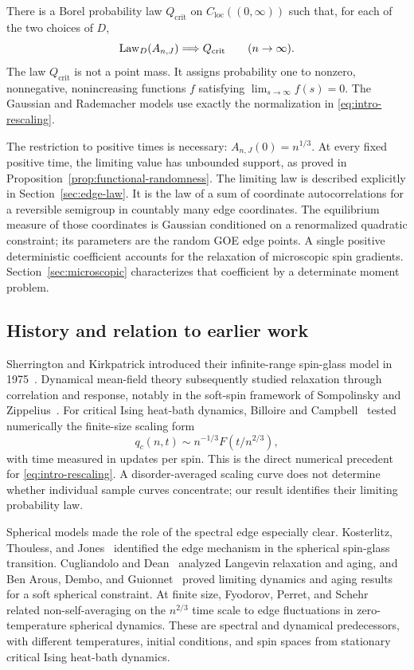 \begin{theorem}\label{thm:main}
There is a Borel probability law $Q_{\mathrm{crit}}$ on
$C_{\mathrm{loc}}((0,\infty))$ such that, for each of the two choices of $D$,
\[
 \operatorname{Law}_D(A_{n,J})\Longrightarrow Q_{\mathrm{crit}}
 \qquad(n\to\infty).
\]
The law $Q_{\mathrm{crit}}$ is not a point mass. It assigns probability one
to nonzero, nonnegative, nonincreasing functions $f$ satisfying
$\lim_{s\to\infty}f(s)=0$. The Gaussian and Rademacher models use exactly
the normalization in \eqref{eq:intro-rescaling}.
\end{theorem}

The restriction to positive times is necessary: $A_{n,J}(0)=n^{1/3}$.
At every fixed positive time, the limiting value has unbounded support,
as proved in Proposition~\ref{prop:functional-randomness}.
The limiting law is described explicitly in Section~\ref{sec:edge-law}.
It is the law of a sum of coordinate autocorrelations for a reversible semigroup in
countably many edge coordinates.
The equilibrium measure of those coordinates is Gaussian conditioned on a
renormalized quadratic constraint; its parameters are the random GOE edge
points. A single positive deterministic coefficient accounts for the
relaxation of microscopic spin gradients. Section~\ref{sec:microscopic}
characterizes that coefficient by a determinate moment problem.

\subsection{History and relation to earlier work}
Sherrington and Kirkpatrick introduced their infinite-range spin-glass
model in 1975~\cite{SK1975}. Dynamical mean-field theory subsequently studied
relaxation through correlation and response, notably in the soft-spin
framework of Sompolinsky and Zippelius~\cite{SompolinskyZippelius1982}.
For critical Ising heat-bath dynamics, Billoire and
Campbell~\cite[Equation~(7)]{BilloireCampbell2011} tested numerically the
finite-size scaling form
\[
 q_c(n,t)\sim n^{-1/3}F(t/n^{2/3}),
\]
with time measured in updates per spin. This is the direct numerical
precedent for \eqref{eq:intro-rescaling}. A disorder-averaged scaling curve
does not determine whether individual sample curves concentrate; our result
identifies their limiting probability law.

Spherical models made the role of the spectral edge especially clear.
Kosterlitz, Thouless, and Jones~\cite{KosterlitzThoulessJones1976} identified
the edge mechanism in the spherical spin-glass transition.
Cugliandolo and Dean~\cite{CugliandoloDean1995} analyzed Langevin relaxation
and aging, and Ben Arous, Dembo, and Guionnet~\cite{BenArousDemboGuionnet2001}
proved limiting dynamics and aging results for a soft spherical constraint.
At finite size, Fyodorov, Perret, and Schehr~\cite{FyodorovPerretSchehr2015}
related non-self-averaging on the $n^{2/3}$ time scale to edge fluctuations
in zero-temperature spherical dynamics. These are spectral and dynamical
predecessors, with different temperatures, initial conditions, and spin
spaces from stationary critical Ising heat-bath dynamics.

